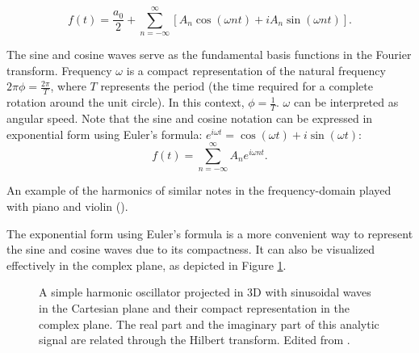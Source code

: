 \begin{equation}
     f(t) = \frac{a_0}{2} + \sum^{\infty}_{n=-\infty} [A_n \cos(\omega nt)+i A_n \sin(\omega nt)].
\end{equation}

The sine and cosine waves serve as the fundamental basis functions in the Fourier transform. Frequency $\omega$ is a compact representation of the natural frequency $2 \pi \phi= \frac{2 \pi}{T}$, where $T$ represents the period (the time required for a complete rotation around the unit circle). In this context, 
$\phi = \frac{1}{T}$. 
$\omega$ can be interpreted as angular speed\sidenotemark{}.  Note that the sine and cosine notation can be expressed in exponential form using Euler's formula: $e^{i \omega t}=\cos(\omega t) + i \sin(\omega t)$:
\begin{equation}
f(t) = \sum^\infty_{n=-\infty} A_n e^{i\omega n t}.
\end{equation}


\begin{marginfigure}
\centering
\vspace{2cm}

\vspace{0.1cm}
\caption{An example of the harmonics of similar notes in the frequency-domain played with piano and violin (\cite{arvin_real-time_2009}).}
\label{harmonicsPianoViolin}  \vspace{1.5cm}
\end{marginfigure}

The exponential form using Euler's formula is a more convenient way to represent the sine and cosine waves due to its compactness. It can also be visualized effectively in the complex plane, as depicted in Figure \ref{complexResonance}.


\begin{figure}[h]
    \centering
    \vspace{0.3cm}
    \caption{A simple harmonic oscillator projected in 3D with sinusoidal waves in the Cartesian plane and their compact representation in the complex plane. The real part and the imaginary part of this analytic signal are related through the Hilbert transform. Edited from \textcite{neutelings_harmonic_2021}.}
    \label{complexResonance}
\end{figure}


